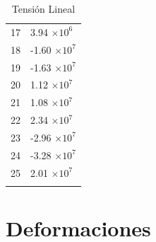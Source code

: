 \documentclass[a4paper,11pt]{article}
\begin{document}
\begin{center}
\begin{longtable}{|R{1.5cm}|R{2.5cm}|}
   17 &         3.94 $\times 10^{           6}$ \\
   18 &        -1.60 $\times 10^{           7}$ \\
   19 &        -1.63 $\times 10^{           7}$ \\
   20 &         1.12 $\times 10^{           7}$ \\
   21 &         1.08 $\times 10^{           7}$ \\
 {\color{OliveGreen}  22} & {\color{OliveGreen}        2.34 $\times 10^{           7}$} \\
   23 &        -2.96 $\times 10^{           7}$ \\
 {\color{red}  24} & {\color{red}       -3.28 $\times 10^{           7}$}\\
   25 &         2.01 $\times 10^{           7}$ \\
\bottomrule[0.8mm]                               
\caption{Tensión Lineal}             
\end{longtable}                                  
\end{center}                                     

\newpage       

\section{Deformaciones}
\end{document}
